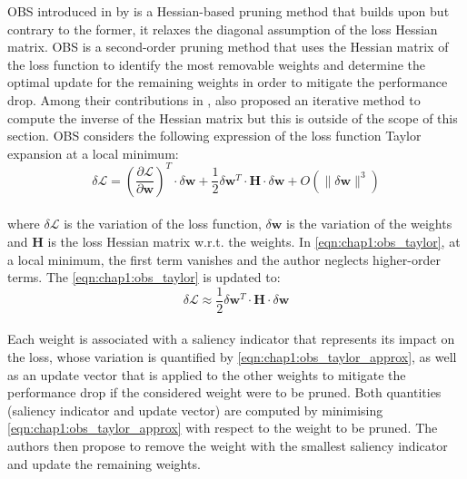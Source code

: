 \ac{OBS} introduced in \cite{DBLP:conf/nips/HassibiS92} by
\citeauthor{DBLP:conf/nips/HassibiS92} is a Hessian-based pruning method that
builds upon \cite{DBLP:conf/nips/CunDS89} but contrary to the former, it relaxes
the diagonal assumption of the loss Hessian matrix. \ac{OBS} is a second-order
pruning method that uses the Hessian matrix of the loss function to identify the
most removable weights and determine the optimal update for the remaining
weights in order to mitigate the performance drop. Among their contributions in
\cite{DBLP:conf/nips/HassibiS92}, \cite{DBLP:conf/nips/HassibiS92} also proposed
an iterative method to compute the inverse of the Hessian matrix but this is
outside of the scope of this section. \ac{OBS} considers the following
expression of the loss function Taylor expansion at a local minimum:\\

\begin{equation}
  \label{eqn:chap1:obs_taylor}
  \delta \mathcal{L} = \left( \frac{\partial \mathcal{L}}{\partial \mathbf{w}} \right)^T \cdot  \delta \mathbf{w} + \frac{1}{2} \delta \mathbf{w}^T \cdot \mathbf{H} \cdot \delta \mathbf{w} + O(\| \delta \mathbf{w}\|^3)
\end{equation}\\

\noindent where $\delta \mathcal{L}$ is the variation of the loss function,
$\delta \mathbf{w}$ is the variation of the weights and $\mathbf{H}$ is the loss
Hessian matrix w.r.t. the weights. In \cref{eqn:chap1:obs_taylor}, at a local
minimum, the first term vanishes and the author neglects higher-order terms. The
\cref{eqn:chap1:obs_taylor} is updated to:\\

\begin{equation}
  \label{eqn:chap1:obs_taylor_approx}
  \delta \mathcal{L} \approx \frac{1}{2} \delta \mathbf{w}^T \cdot \mathbf{H} \cdot \delta \mathbf{w} 
\end{equation}\\

\noindent Each weight is associated with a saliency indicator that represents
its impact on the loss, whose variation is quantified by
\cref{eqn:chap1:obs_taylor_approx}, as well as an update vector that is applied
to the other weights to mitigate the performance drop if the considered weight
were to be pruned. Both quantities (saliency indicator and update vector) are
computed by minimising \cref{eqn:chap1:obs_taylor_approx} with respect to the
weight to be pruned. The authors then propose to remove the weight with the
smallest saliency indicator and update the remaining weights.\\

